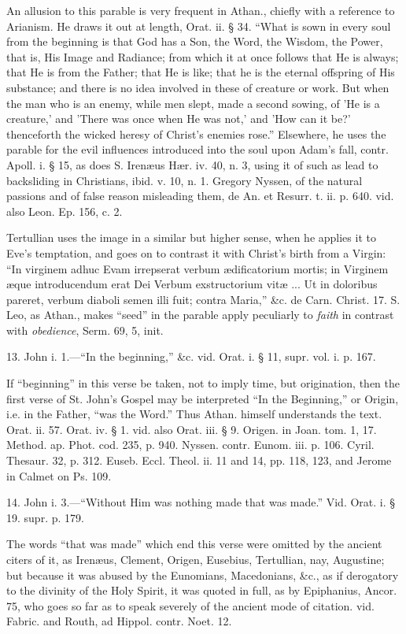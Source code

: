 An allusion to this parable is very frequent in
Athan., chiefly with a reference to Arianism. He draws it out at
length, Orat. ii. § 34. ``What is sown in every soul from the
beginning is that God has a Son, the Word, the Wisdom, the Power, that
is, His Image and Radiance; from which it at once follows that He is
always; that He is from the Father; that He is like; that he is the
eternal offspring of His substance; and there is no idea involved in
these of creature or work. But when the man who is an enemy, while men
slept, made a second sowing, of 'He is a creature,' and 'There was
once when He was not,' and 'How can it be?' thenceforth the wicked
heresy of Christ's enemies rose.'' Elsewhere, he uses the parable for
the evil influences introduced into the soul upon Adam's fall, contr.
Apoll. i. § 15, as does S. Irenæus Hær. iv. 40, n. 3, using it of
such as lead to backsliding in Christians, ibid. v. 10, n. 1. Gregory
Nyssen, of the natural passions and of false reason misleading them,
de An. et Resurr. t. ii. p. 640. vid. also Leon. Ep. 156, c. 2.

Tertullian uses the image in a similar but higher
sense, when he applies it to Eve's temptation, and goes on to contrast
it with Christ's birth from a Virgin: ``In virginem adhuc Evam
irrepserat verbum ædificatorium mortis; in Virginem æque
introducendum erat Dei Verbum exstructorium vitæ ... Ut in doloribus
pareret, verbum diaboli semen illi fuit; contra Maria,'' \&c. de
Carn. Christ. 17. S. Leo, as Athan., makes ``seed'' in the parable apply
peculiarly to \emph{faith} in contrast with \emph{obedience}, Serm.
69, 5, init.

13. John i. 1.—``In the beginning,'' \&c. vid.
Orat. i. § 11, supr. vol. i. p. 167.

If ``beginning'' in this verse be taken, not to
imply time, but origination, then the first verse of St. John's Gospel
may be interpreted ``In the Beginning,'' or Origin, i.e. in the Father, ``was
the Word.'' Thus Athan. himself understands the text. Orat. ii. 57.
Orat. iv. § 1. vid. also Orat. iii. § 9. Origen. in Joan. tom. 1,
17. Method. ap. Phot. cod. 235, p. 940. Nyssen. contr. Eunom. iii. p.
106. Cyril. Thesaur. 32, p. 312. Euseb. Eccl. Theol. ii. 11 and 14,
pp. 118, 123, and Jerome in Calmet on Ps. 109.

14. John i. 3.—``Without Him was nothing made
that was made.'' Vid. Orat. i. § 19. supr. p. 179.

The words ``that was made'' which end this verse
were omitted by the ancient citers of it, as Irenæus, Clement, Origen,
Eusebius, Tertullian, nay, Augustine; but because it was abused by the
Eunomians, Macedonians, \&c., as if derogatory to the
divinity of the Holy Spirit, it was quoted in full, as by Epiphanius,
Ancor. 75, who goes so far as to speak severely of the ancient mode of
citation. vid. Fabric. and Routh, ad Hippol. contr. Noet. 12.

